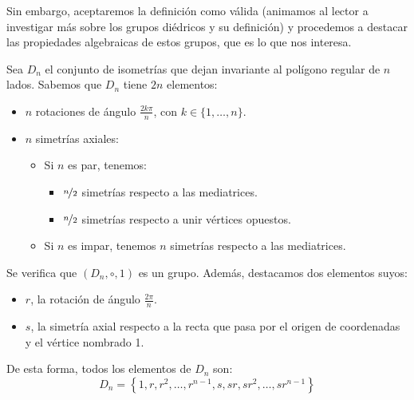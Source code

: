 Sin embargo, aceptaremos la definición como válida (animamos al lector a investigar más sobre los grupos diédricos y su definición) y procedemos a destacar las propiedades algebraicas de estos grupos, que es lo que nos interesa.

\begin{definicion}
    Sea $D_n$ el conjunto de isometrías que dejan invariante al polígono regular de $n$ lados. Sabemos que $D_n$ tiene $2n$ elementos:
    \begin{itemize}
        \item $n$ rotaciones de ángulo $\frac{2k\pi}{n}$, con $k\in \{1,\ldots,n\}$.
        \item $n$ simetrías axiales:
            \begin{itemize}
                \item Si $n$ es par, tenemos:
                    \begin{itemize}
                        \item $\nicefrac{n}{2}$ simetrías respecto a las mediatrices.
                        \item $\nicefrac{n}{2}$ simetrías respecto a unir vértices opuestos.
                    \end{itemize}
                \item Si $n$ es impar, tenemos $n$ simetrías respecto a las mediatrices.
            \end{itemize}
    \end{itemize}
    Se verifica que $(D_n,\circ,1)$ es un grupo. Además, destacamos dos elementos suyos:
    \begin{itemize}
        \item $r$, la rotación de ángulo $\frac{2\pi}{n}$.
        \item $s$, la simetría axial respecto a la recta que pasa por el origen de coordenadas y el vértice nombrado 1.
    \end{itemize}
    De esta forma, todos los elementos de $D_n$ son:
    \begin{equation*}
        D_n = \left\{1, r, r^2, \ldots, r^{n-1}, s, sr, sr^2, \ldots, sr^{n-1}\right\}
    \end{equation*}
\end{definicion}

